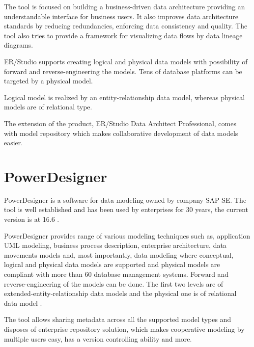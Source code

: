 The tool is focused on building a business-driven data architecture providing an understandable interface for business users. It also improves data architecture standards by reducing redundancies, enforcing data consistency and quality.
The tool also tries to provide a framework for visualizing data flows by data lineage diagrams. 

ER/Studio supports creating logical and physical data models with possibility of forward and reverse-engineering the models. Tens of database platforms can be targeted by a physical model.

Logical model is realized by an entity-relationship data model, whereas physical models are of relational type.

The  extension of the product, ER/Studio Data Architect Professional, comes with model repository which makes collaborative development of data models easier. 

\section{PowerDesigner}

PowerDesigner is a software for data modeling owned by company SAP SE. The tool is well established and has been used by enterprises for 30 years, the current version is at 16.6 \cite{PowerDesignerHistory}.

PowerDesigner provides range of various modeling techniques such as, application UML modeling, business process description, enterprise architecture, data movements models and, most importantly, data modeling where conceptual, logical and physical data models are supported and physical models are compliant with more than 60 database management systems.
Forward and reverse-engineering of the models can be done.
The first two levels are of extended-entity-relationship data models and the physical one is of relational data model \cite{PowerDesignerFeatures}.

The tool allows sharing metadata across all the supported model types and disposes of enterprise repository solution, which makes cooperative modeling by multiple users easy, has a version controlling ability and more.